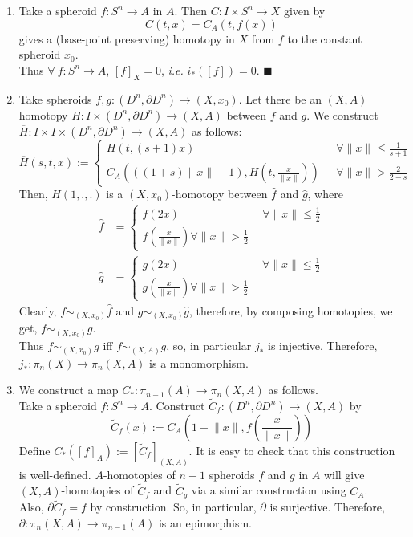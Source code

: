 \documentclass[11pt]{article}
\numberwithin{equation}{section}
\begin{document}
\begin{enumerate}
	\item Take a spheroid $f:S^n\rightarrow A$ in $A$. Then $C:I\times S^n\rightarrow X$ given by
	$$C(t,x)= C_A(t,f(x))$$ gives a (base-point preserving) homotopy in $X$ from $f$ to the constant spheroid $x_0$. \\ 
	Thus $\forall\ f:S^n\rightarrow A$, $[f]_X=0$, \emph{i.e.} $i_*([f])=0$. $\blacksquare$ 
	\item Take spheroids $f,g:(D^n,\partial D^n)\rightarrow (X,x_0)$. Let there be an $(X,A)$ homotopy $H:I\times(D^n,\partial D^n)\rightarrow (X,A)$ between $f$ and $g$. We construct $\overline{H}:I\times I\times(D^n,\partial D^n)\rightarrow (X,A)$ as follows: 
	$$\overline{H}(s,t,x):=
	\begin{cases}
	H(t,(s+1)x)&\ \ \ \forall \lVert x\rVert \leqslant \frac{1}{s+1} \\
	C_A\left(((1+s)\lVert x\rVert-1),H\left(t,\frac{x}{\lVert x\rVert}\right)\right)&\ \ \ \forall \lVert x\rVert > \frac{2}{2-s} 
	\end{cases}$$
Then, $\overline{H}(1,.,.)$ is a $(X,x_0)$-homotopy between $\hat{f}$ and $\hat{g}$, where 
\begin{align*}
\hat{f}&= \begin{cases}f(2x)&\ \ \forall\lVert x\rVert \leqslant \frac{1}{2} \\ f\left(\frac{x}{\lVert x\rVert}\right) \forall\lVert x\rVert > \frac{1}{2} \end{cases} \\ 
\hat{g}&= \begin{cases}g(2x)&\ \ \forall\lVert x\rVert \leqslant \frac{1}{2} \\ g\left(\frac{x}{\lVert x\rVert}\right) \forall\lVert x\rVert > \frac{1}{2} \end{cases}
\end{align*}
Clearly, $f\sim_{(X,x_0)}\hat{f}$ and $g\sim_{(X,x_0)}\hat{g}$, therefore, by composing homotopies, we get, $f\sim_{(X,x_0)}g$. \\[6pt]
Thus $f\sim_{(X,x_0)} g$ iff $f\sim_{(X,A)} g$, so, in particular $j_*$ is injective. Therefore, $j_{*}:\pi_n(X)\rightarrow\pi_n(X,A)$ is a monomorphism.
\item We construct a map $C_{*}:\pi_{n-1}(A)\rightarrow \pi_n(X,A)$ as follows. \\ Take a spheroid $f:S^n\rightarrow A$. Construct $\tilde{C}_f:(D^n,\partial D^n)\rightarrow (X,A)$ by $$\tilde{C}_f(x):=C_A\left(1-\lVert x\rVert, f\left(\frac{x}{\lVert x\rVert}\right)\right)$$
Define $C_*([f]_A) := [\tilde{C}_f]_{(X,A)}$. It is easy to check that this construction is well-defined. $A$-homotopies of $n-1$ spheroids $f$ and $g$ in $A$ will give $(X,A)$-homotopies of $\tilde{C}_f$ and $\tilde{C}_g$ via a similar construction using $C_A$. \\[6pt]
Also, $\partial \tilde{C}_f = f$ by construction. So, in particular, $\partial$ is surjective. Therefore, $\partial: \pi_n(X,A)\rightarrow \pi_{n-1}(A)$ is an epimorphism.
\end{enumerate}
\end{document}
